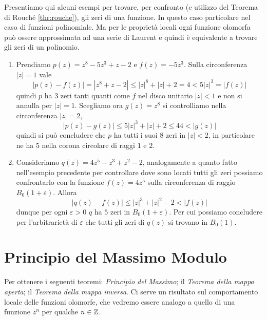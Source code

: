 \begin{example}
  Presentiamo qui alcuni esempi per trovare, per confronto (e utilizzo del
  Teorema di Rouché \ref{thr:rouche}), gli zeri di una funzione. In questo caso
  particolare nel caso di funzioni polinomiale. Ma per le proprietà locali ogni
  funzione olomorfa può ossere approssimata ad una serie di Laurent e quindi
  è equivalente a trovare gli zeri di un polinomio.
  \begin{enumerate}
    \item Prendiamo $p(z) = z^8 - 5z^3 + z -2$ e $f(z) = -5z^3$. Sulla
      circonferenza $|z| = 1$ vale 
      \begin{equation*}
        |p(z) - f(z)| = |z^8 + z -2| \le |z|^8 + |z| + 2 = 4 < 5|z|^3 = |f(z)|
      \end{equation*}
      quindi $p$ ha $3$ zeri tanti quanti come $f$ nel disco unitario $|z| < 1$
      e non si annulla per $|z| =1$. Scegliamo ora $g(z) = z^8$ si controlliamo
      nella circonferenza $|z| = 2$, 
      \begin{equation*}
        |p(z) - g(z)| \le 5|z|^3 + |z| + 2 \le 44 < |g(z)|
      \end{equation*}
      quindi si può concludere che $p$ ha tutti i suoi $8$ zeri in $|z| < 2$, in
      particolare ne ha $5$ nella corona circolare di raggi $1$ e $2$.
    \item Consideriamo $q(z) = 4z^5 - z^3 + z^2 -2$, analogamente a quanto fatto
      nell'esempio precedente per controllare dove sono locati tutti gli zeri
      possiamo confrontarlo con la funzione $f(z) = 4z^5$ sulla circonferenza di
      raggio $B_0(1+\varepsilon)$. Allora
      \begin{equation*}
        |q(z) - f(z)| \le |z|^3 + |z|^2 - 2 < |f(z)|
      \end{equation*}
      dunque per ogni $\varepsilon > 0$ $q$ ha $5$ zeri in $B_0(1+\varepsilon)$.
      Per cui possiamo concludere per l'arbitrarietà di $\varepsilon$ che tutti
      gli zeri di $q(z)$ si trovano in $\overline{B_0(1)}$.
  \end{enumerate}
\end{example}

\section{Principio del Massimo Modulo}

Per ottenere i seguenti teoremi: \emph{Principio del Massimo}; il 
\emph{Teorema della mappa aperta}; il \emph{Teorema della mappa inversa}. Ci
serve un risultato sul comportamento locale delle funzioni olomorfe, che vedremo
essere analogo a quello di una funzione $z^n$ per qualche $n\in \mathbb{Z}$.

